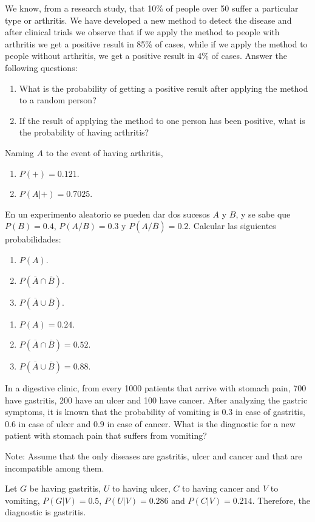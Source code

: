 {We know, from a research study, that 10\% of people over 50 suffer a particular type or arthritis. 
We have developed a new method to detect the disease and after clinical trials we observe that if we apply the method to people with arthritis we get a positive result in 85\% of cases, while if we apply the method to people without arthritis, we get a positive result in 4\% of cases. 
Answer the following questions:
\begin{enumerate}
\item What is the probability of getting a positive result after applying the method to a random person?
\item If the result of applying the method to one person has been positive, what is the probability of having arthritis?
\end{enumerate}
}
{Naming $A$ to the event of having arthritis, 
\begin{enumerate}
\item $P(+)=0.121$.
\item $P(A|+)=0.7025$. 
\end{enumerate}
}
{}


{En un experimento aleatorio se pueden dar dos sucesos $A$ y $B$, y se sabe que $P(B)=0.4$, $P(A/B)=0.3$ y
$P(A/\overline{B})=0.2$.
Calcular las siguientes probabilidades:
\begin{enumerate}
\item $P(A)$.
\item $P(\overline{A}\cap \overline{B})$.
\item $P(\overline{A}\cup \overline{B})$.
\end{enumerate}
}
{
\begin{enumerate}
\item $P(A)=0.24$.
\item $P(\overline{A}\cap \overline{B})=0.52$.
\item $P(\overline{A}\cup \overline{B})=0.88$.
\end{enumerate}
}
{}


{In a digestive clinic, from every 1000 patients that arrive with stomach pain, 700 have gastritis,
200 have an ulcer and 100 have cancer.
After analyzing the gastric symptoms, it is known that the probability of vomiting is $0.3$ in case of gastritis, $0.6$ in case of ulcer and $0.9$ in case of cancer. 
What is the diagnostic for a new patient with stomach pain that suffers from vomiting?

Note: Assume that the only diseases are gastritis, ulcer and cancer and that are incompatible among them.
}
{Let $G$ be having gastritis, $U$ to having ulcer, $C$ to having cancer and $V$ to vomiting, $P(G|V)=0.5$, $P(U|V)=0.286$ and $P(C|V)=0.214$.
Therefore, the diagnostic is gastritis.}
{}


